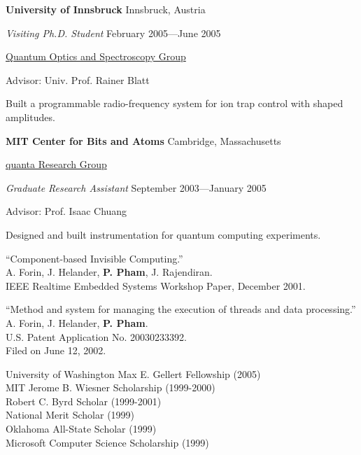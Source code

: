 \documentclass[letter]{article}
\begin{document}
\newpage

{\bf University of Innsbruck} \hfill Innsbruck, Austria
\par
{\em Visiting Ph.D. Student} \hfill February 2005---June 2005
\par
\href{http://heart-c704.uibk.ac.at/index.html}{Quantum Optics and Spectroscopy Group}
\par
Advisor: Univ. Prof. Rainer Blatt
\par
Built a programmable radio-frequency system for ion trap control
with shaped amplitudes.
\par

\vspace{\baselineskip}
\par
{\bf MIT Center for Bits and Atoms} \hfill Cambridge, Massachusetts
\par
\href{http://web.mit.edu/~cua/www/quanta/}{quanta Research Group}
\par
{\em Graduate Research Assistant} \hfill September 2003---January 2005
\par
Advisor: Prof. Isaac Chuang
\par
Designed and built instrumentation for quantum computing experiments.
\par

\vspace{\baselineskip}
\par
``Component-based Invisible Computing.''
\\
A. Forin, J. Helander, \textbf{P. Pham}, J. Rajendiran.\\
IEEE Realtime Embedded Systems Workshop Paper, December 2001.

\vspace{\baselineskip}

``Method and system for managing the execution of threads and data processing.''
\\
A. Forin, J. Helander, \textbf{P. Pham}.\\
U.S. Patent Application No. 20030233392.\\
Filed on June 12, 2002.

\vspace{\baselineskip}
University of Washington Max E. Gellert Fellowship (2005)\\
MIT Jerome B. Wiesner Scholarship (1999-2000)\\
Robert C. Byrd Scholar (1999-2001)\\
National Merit Scholar (1999)\\
Oklahoma All-State Scholar (1999)\\
Microsoft Computer Science Scholarship (1999)
\par
\end{document}
